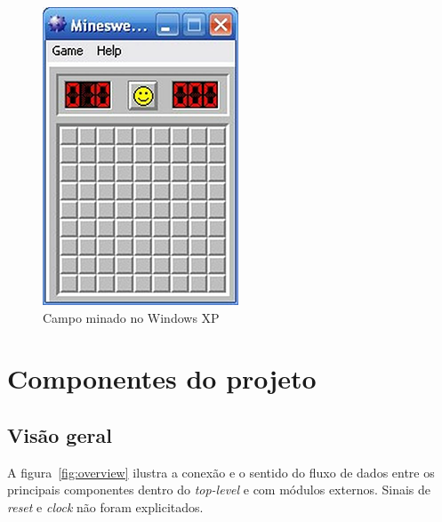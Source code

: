 \documentclass[12pt]{article}
\begin{document}
\begin{figure}[ht!]
	\centering
	\includegraphics[scale=0.75]{img/game.png}
	\vspace{3mm}
	\caption{Campo minado no Windows XP}
	\label{fig:game}
\end{figure}


\section{Componentes do projeto}
\label{sec:components}


\subsection{Visão geral}
\label{sec:overview}

A figura~\ref{fig:overview} ilustra a conexão e o sentido do fluxo de dados
entre os principais componentes dentro do \emph{top-level} e com módulos
externos. Sinais de \emph{reset} e \emph{clock} não foram explicitados.
\end{document}
